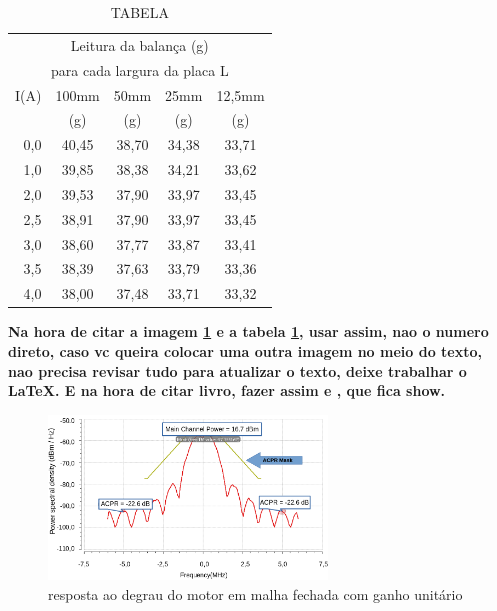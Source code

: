 \documentclass[twocolumn]{article}
\begin{document}
	\lipsum[1]

	\begin{table}
		\centering
		\caption{TABELA} \label{tabelaqualquer}
		\begin{tabular}[h]{r|cccc}
			\multicolumn{5}{c}{Leitura da balança (g)}\\
			\multicolumn{5}{c}{para cada largura da placa L}\\
			\hline
			I(A) & 100mm & 50mm & 25mm & 12,5mm\\
			     &   (g) &  (g) & (g) &  (g)\\
			\hline
			0,0 & 40,45 & 38,70 & 34,38 & 33,71 \\
			1,0 & 39,85 & 38,38 & 34,21 & 33,62\\
			2,0 & 39,53 & 37,90 & 33,97 & 33,45\\
			2,5 & 38,91 & 37,90 & 33,97 & 33,45\\
			3,0 & 38,60 & 37,77 & 33,87 & 33,41\\
			3,5 & 38,39 & 37,63 & 33,79 & 33,36\\
			4,0 & 38,00 & 37,48 & 33,71 & 33,32\\
			\hline
		\end{tabular}
	\end{table}

	\textbf{Na hora de citar a imagem \ref{feedback1} e a tabela \ref{tabelaqualquer}, usar assim, nao o numero direto, caso vc queira colocar uma outra imagem no meio do texto, nao precisa revisar tudo para atualizar o texto, deixe trabalhar o \LaTeX.
	E na hora de citar livro, fazer assim \cite{z} e \cite{pat}, que fica show.}

	\begin{figure}
  		\begin{center}
		\includegraphics[width=7.4cm]{ex.png}
		 \caption{resposta ao degrau do motor em malha fechada com ganho unitário} \label{feedback1}
  		\end{center}
  	\end{figure}
\end{document}

